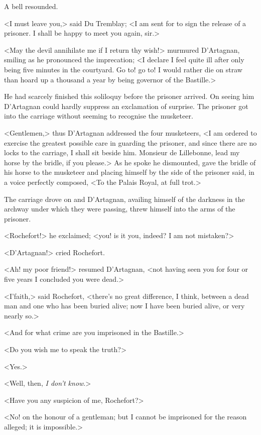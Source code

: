 A bell resounded.

<I must leave you,> said Du Tremblay; <I am sent for to sign the release of a prisoner. I shall be happy to meet you again, sir.>

<May the devil annihilate me if I return thy wish!> murmured D'Artagnan, smiling as he pronounced the imprecation; <I declare I feel quite ill after only being five minutes in the courtyard. Go to! go to! I would rather die on straw than hoard up a thousand a year by being governor of the Bastille.>

He had scarcely finished this soliloquy before the prisoner arrived. On seeing him D'Artagnan could hardly suppress an exclamation of surprise. The prisoner got into the carriage without seeming to recognise the musketeer.

<Gentlemen,> thus D'Artagnan addressed the four musketeers, <I am ordered to exercise the greatest possible care in guarding the prisoner, and since there are no locks to the carriage, I shall sit beside him. Monsieur de Lillebonne, lead my horse by the bridle, if you please.> As he spoke he dismounted, gave the bridle of his horse to the musketeer and placing himself by the side of the prisoner said, in a voice perfectly composed, <To the Palais Royal, at full trot.>

The carriage drove on and D'Artagnan, availing himself of the darkness in the archway under which they were passing, threw himself into the arms of the prisoner.

<Rochefort!> he exclaimed; <you! is it you, indeed? I am not mistaken?>

<D'Artagnan!> cried Rochefort.

<Ah! my poor friend!> resumed D'Artagnan, <not having seen you for four or five years I concluded you were dead.>

<I'faith,> said Rochefort, <there's no great difference, I think, between a dead man and one who has been buried alive; now I have been buried alive, or very nearly so.>

<And for what crime are you imprisoned in the Bastille.>

<Do you wish me to speak the truth?>

<Yes.>

<Well, then, \textit{I don't know}.>

<Have you any suspicion of me, Rochefort?>

<No! on the honour of a gentleman; but I cannot be imprisoned for the reason alleged; it is impossible.>

